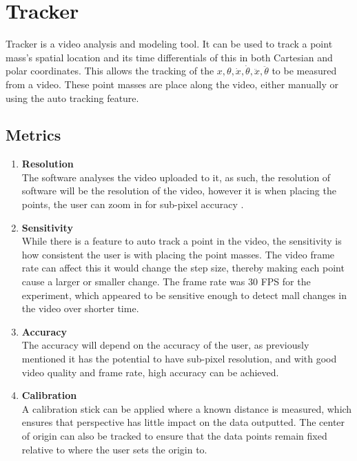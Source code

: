 \section{Tracker}
    Tracker is a video analysis and modeling tool. It can be used to track a point mass's spatial location and its time differentials of this in both Cartesian  and polar coordinates. This allows the tracking of the \(x,\theta,\dot{x},\dot{\theta},\ddot{x},\ddot{\theta}\) to be measured from a video.  These point masses are place along the video, either manually or using the auto tracking feature.
    \subsection{Metrics}
        \begin{enumerate}
            \item \textbf{Resolution}\\
                The software analyses the video uploaded to it, as such, the resolution of software will be the resolution of the video, however it is when placing the points, the user can zoom in for sub-pixel accuracy \citep{TrackerHelp}. 
            \item \textbf{Sensitivity}\\
                While there is a feature to auto track a point in the video, the sensitivity is how consistent the user is with placing the point masses. The video frame rate can affect this it would change the step size, thereby making each point cause a larger or smaller change. The frame rate was 30 FPS for the experiment, which appeared to be sensitive enough to detect mall changes in the video over shorter time.
            \item \textbf{Accuracy}\\
                The accuracy will depend on the accuracy of the user, as previously mentioned it has the potential to have sub-pixel resolution, and with good video quality and frame rate, high accuracy can be achieved.
            \item \textbf{Calibration}\\
                A calibration stick can be applied where a known distance is measured, which ensures that perspective has little impact on the data outputted. The center of origin can also be tracked to ensure that the data points remain fixed relative to where the user sets the origin to.
        \end{enumerate}